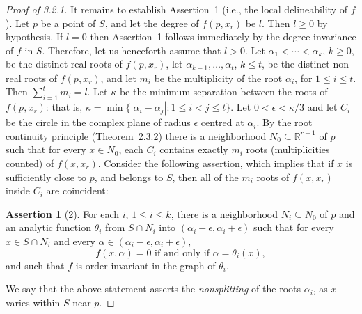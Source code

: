 \documentclass[11pt]{article}
\theoremstyle{plain}
\theoremstyle{definition}
\newtheorem*{assertion}{Assertion}
\newcommand{\R}{\mathbb{R}}
\begin{document}
\begin{proof}[Proof of 3.2.1]
It remains to establish Assertion~1 (i.e., the local delineability of
$f$). Let $p$ be a point of $S$, and let the degree of $f(p, x_r)$ be
$l$. Then $l \ge 0$ by hypothesis. If $l = 0$ then Assertion~1 follows
immediately by the degree-invariance of $f$ in $S$. Therefore, let us
henceforth assume that $l > 0$. Let $\alpha_1 < \cdots < \alpha_k$,
$k \ge 0$, be the distinct real roots of $f(p, x_r)$, let
$\alpha_{k+1}, \ldots, \alpha_t$, $k \le t$, be the distinct non-real
roots of $f(p, x_r)$, and let $m_i$ be the multiplicity of the root
$\alpha_i$, for $1 \le i \le t$. Then $\sum_{i=1}^{t} m_i = l$. Let
$\kappa$ be the minimum separation between the roots of $f(p, x_r)$:
that is, $\kappa = \min\{ |\alpha_i - \alpha_j| : 1 \le i < j \le t \}$.
Let $0 < \epsilon < \kappa/3$ and let $C_i$ be the circle in the
complex plane of radius $\epsilon$ centred at $\alpha_i$. By the root
continuity principle (Theorem~2.3.2) there is a neighborhood
$N_0 \subseteq \R^{r-1}$ of $p$ such that for every $x \in N_0$, each
$C_i$ contains exactly $m_i$ roots (multiplicities counted) of
$f(x, x_r)$. Consider the following assertion, which implies that if
$x$ is sufficiently close to $p$, and belongs to $S$, then all of the
$m_i$ roots of $f(x, x_r)$ inside $C_i$ are coincident:

\begin{assertion}[2]
For each $i$, $1 \le i \le k$, there is a neighborhood
$N_i \subseteq N_0$ of $p$ and an analytic function $\theta_i$ from
$S \cap N_i$ into $(\alpha_i - \epsilon, \alpha_i + \epsilon)$ such
that for every $x \in S \cap N_i$ and every
$\alpha \in (\alpha_i - \epsilon, \alpha_i + \epsilon)$,
\begin{equation}
f(x, \alpha) = 0 \text{ if and only if } \alpha = \theta_i(x), \tag{3.3.1}
\end{equation}
and such that $f$ is order-invariant in the graph of $\theta_i$.
\end{assertion}

We say that the above statement asserts the \emph{nonsplitting} of the
roots $\alpha_i$, as $x$ varies within $S$ near $p$.


\end{proof}
\end{document}
